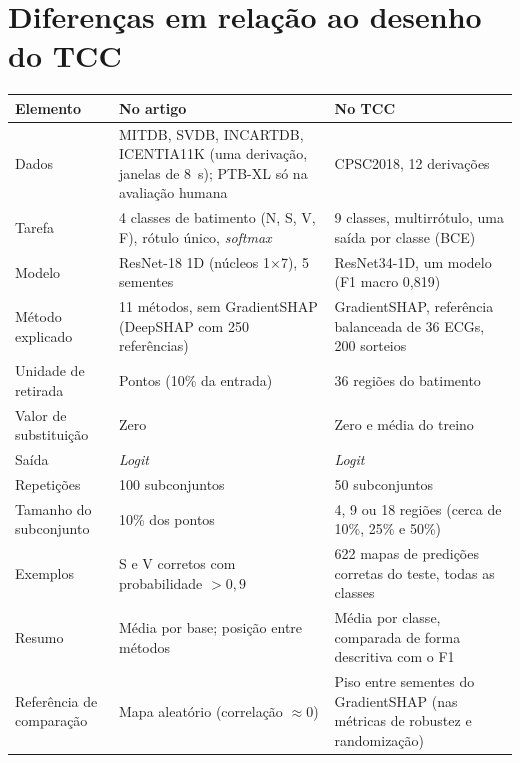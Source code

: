 \documentclass[11pt,a4paper]{article}
\begin{document}
\section{Diferenças em relação ao desenho do TCC}
\begin{center}\small
\begin{tabularx}{\linewidth}{lXX}
\toprule
\textbf{Elemento} & \textbf{No artigo} & \textbf{No TCC} \\
\midrule
Dados & MITDB, SVDB, INCARTDB, ICENTIA11K (uma derivação, janelas de 8~s); PTB-XL só na avaliação humana & CPSC2018, 12 derivações \\ \addlinespace
Tarefa & 4 classes de batimento (N, S, V, F), rótulo único, \textit{softmax} & 9 classes, multirrótulo, uma saída por classe (BCE) \\ \addlinespace
Modelo & ResNet-18 1D (núcleos 1×7), 5 sementes & ResNet34-1D, um modelo (F1 macro 0,819) \\ \addlinespace
Método explicado & 11 métodos, sem GradientSHAP (DeepSHAP com 250 referências) & GradientSHAP, referência balanceada de 36 ECGs, 200 sorteios \\ \addlinespace
Unidade de retirada & Pontos (10\% da entrada) & 36 regiões do batimento \\ \addlinespace
Valor de substituição & Zero & Zero e média do treino \\ \addlinespace
Saída & \textit{Logit} & \textit{Logit} \\ \addlinespace
Repetições & 100 subconjuntos & 50 subconjuntos \\ \addlinespace
Tamanho do subconjunto & 10\% dos pontos & 4, 9 ou 18 regiões (cerca de 10\%, 25\% e 50\%) \\ \addlinespace
Exemplos & S e V corretos com probabilidade $> 0{,}9$ & 622 mapas de predições corretas do teste, todas as classes \\ \addlinespace
Resumo & Média por base; posição entre métodos & Média por classe, comparada de forma descritiva com o F1 \\ \addlinespace
Referência de comparação & Mapa aleatório (correlação $\approx 0$) & Piso entre sementes do GradientSHAP (nas métricas de robustez e randomização) \\
\bottomrule
\end{tabularx}
\end{center}
\end{document}
